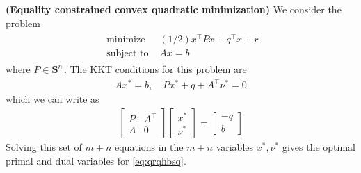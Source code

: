 \documentclass{article}
\newcommand{\bfs}[1]{\textbf{({#1}) }}
\begin{document}
\begin{exma}\bfs{Equality constrained convex quadratic minimization}
We consider the problem
\begin{align}
\begin{array}{ll}
\text { minimize } & (1 / 2) x^{\top} P x+q^{\top} x+r \\
\text { subject to } & A x=b
\end{array}\label{eq:qrqhbsq}
\end{align}
where $P \in \mathbf{S}_{+}^{n} .$ The KKT conditions for this problem are
\begin{align*}
A x^* =b, \quad P x^* +q+A^{\top} \nu^* =0
\end{align*}
which we can write as
\begin{align*}
\left[\begin{array}{cc}
P & A^{\top} \\
A & 0
\end{array}\right]\left[\begin{array}{l}
x^*  \\
\nu^* 
\end{array}\right]=\left[\begin{array}{c}
-q \\
b
\end{array}\right]
\end{align*}
Solving this set of $m+n$ equations in the $m+n$ variables $x^* , \nu^* $ gives the optimal primal and dual variables for \cref{eq:qrqhbsq}.
\end{exma}
\end{document}

